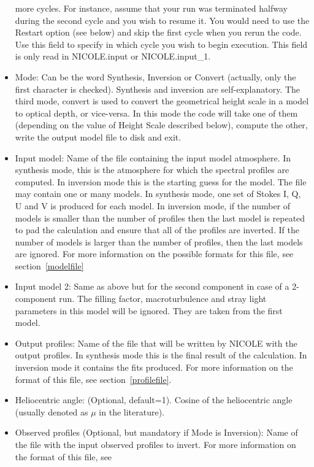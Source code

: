 \begin{itemize}
  more cycles. For instance, assume that your run was terminated
  halfway during the second cycle and you wish to resume it. You would
  need to use the Restart option (see below) and skip the first cycle
  when you rerun the code. Use this field to specify in which cycle
  you wish to begin execution. This field is only read in NICOLE.input
  or NICOLE.input\_1.
\item Mode: Can be the word Synthesis, Inversion or Convert (actually,
  only the first character is checked). Synthesis and inversion are
  self-explanatory. The third mode, convert is used to convert the
  geometrical height scale in a model to optical depth, or
  vice-versa. In this mode the code will take one of them (depending
  on the value of Height Scale described below), compute the other,
  write the output model file to disk and exit.
\item Input model: Name of the file containing the input model
  atmosphere. In synthesis mode, this is the atmosphere for which the
  spectral profiles are computed. In inversion mode this is the
  starting guess for the model. The file may contain one or many
  models. In synthesis mode, one set of Stokes I, Q, U and V is
  produced for each model. In inversion mode, if the number of models
  is smaller than the number of profiles then the last model is
  repeated to pad the calculation and ensure that all of the profiles
  are inverted. If the number of models is larger than the number of
  profiles, then the last models are ignored. For more information on
  the possible formats for this file, see section~\ref{modelfile}
\item Input model 2: Same as above but for the second component in
  case of a 2-component run. The filling factor, macroturbulence and
  stray light parameters in this model will be ignored. They are taken
  from the first model.
\item Output profiles: Name of the file that will be written by NICOLE
  with the output profiles. In synthesis mode this is the final result
  of the calculation. In inversion mode it contains the fits
  produced. For more information on the format of this file, see
  section~\ref{profilefile}.
\item Heliocentric angle: (Optional, default=1). Cosine of the
  heliocentric angle (usually denoted as $\mu$ in the literature).
\item Observed profiles (Optional, but mandatory if Mode is
  Inversion): Name of the file with the input observed profiles to
  invert. For more information on the format of this file, see

\end{itemize}
